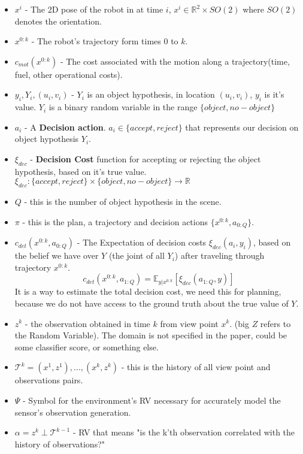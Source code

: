 \documentclass{article}
\begin{document}
	\begin{itemize}
		\item $x^i$ - The 2D pose of the robot in at time $i$,
		$x^i \in \mathbb{R}^2 \times SO(2)$ where $SO(2)$ denotes the orientation.
		\item $x^{0:k}$ - The robot's trajectory form times $0$ to $k$.
		\item $c_{mot}(x^{0:k})$ - The cost associated with the motion along a trajectory(time, fuel, other operational costs).
		\item $y_i, Y_i, (u_i, v_i)$ - $Y_i$ is an object hypothesis, in location $(u_i, v_i)$,
		$y_i$ is it's value. $Y_i$ is a binary random variable in the range $\{object,no-object\}$
		\item $a_i$ - A \textbf{Decision action}. $a_i\in\{accept,reject\}$ that represents our decision on object hypothesis $Y_i$. 
		\item $\xi_{dec}$ - \textbf{Decision Cost} function for accepting or rejecting the object hypothesis, based on it's true value.
		$\xi_{dec} : \{accept,reject\}\times\{object,no-object\}\rightarrow\mathbb{R}$ 
		\item $Q$ - this is the number of object hypothesis in the scene.
		\item $\pi$ - this is the plan, a trajectory and decision actions $\{x^{0:k},a_{0:Q}\}$.
		\item $c_{det}(x^{0:k},a_{0:Q})$ - The Expectation of decision costs $\xi_{dec}(a_i,y_i)$, based on the belief we have over $Y$ (the joint of all $Y_i$) after traveling through trajectory $x^{0:k}$.
		\begin{equation}
		c_{det}(x^{0:k},a_{1:Q})=\mathbb{E}_{y|x^{0:k}}[\xi_{dec}(a_{1:Q},y)]
		\end{equation}  
		It is a way to estimate the total decision cost, we need this for planning, because we do not have access to the ground truth about the true value of $Y$.
		\item $z^k$ - the observation obtained in time $k$ from view point $x^k$. (big $Z$ refers to the Random Variable). The domain is not specified in the paper, could be some classifier score, or something else.
		\item $\mathcal{T}^k = {(x^1,z^1),...,(x^k,z^k)}$ - this is the history of all view point and observations pairs.
		\item $\Psi$ - Symbol for the environment's RV necessary for accurately model the sensor's observation generation.
		\item $\alpha = z^k \perp \mathcal{T}^{k-1}$ - RV that means "is the k'th observation correlated with the history of observations?"
	\end{itemize}
\end{document}
